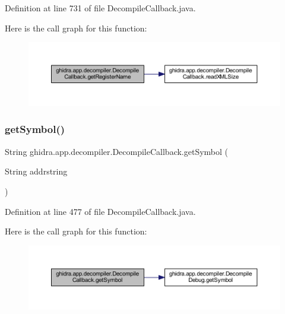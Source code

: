 Definition at line 731 of file Decompile\+Callback.\+java.

Here is the call graph for this function\+:
\nopagebreak
\begin{figure}[H]
\begin{center}
\leavevmode
\includegraphics[width=350pt]{classghidra_1_1app_1_1decompiler_1_1_decompile_callback_ad51f66c28eeca53ef3fc87faf289c76c_cgraph}
\end{center}
\end{figure}
\mbox{\label{classghidra_1_1app_1_1decompiler_1_1_decompile_callback_a939cb3e41e07c4fb43bdfef6ddb615df}} 
\subsubsection{\texorpdfstring{getSymbol()}{getSymbol()}}
{\footnotesize\ttfamily String ghidra.\+app.\+decompiler.\+Decompile\+Callback.\+get\+Symbol (\begin{DoxyParamCaption}\item[{String}]{addrstring }\end{DoxyParamCaption})\hspace{0.3cm}{\ttfamily [inline]}}



Definition at line 477 of file Decompile\+Callback.\+java.

Here is the call graph for this function\+:
\nopagebreak
\begin{figure}[H]
\begin{center}
\leavevmode
\includegraphics[width=350pt]{classghidra_1_1app_1_1decompiler_1_1_decompile_callback_a939cb3e41e07c4fb43bdfef6ddb615df_cgraph}
\end{center}
\end{figure}
\mbox{\label{classghidra_1_1app_1_1decompiler_1_1_decompile_callback_a029ff53ae77f771cf7e3311c435a98fa}} 
